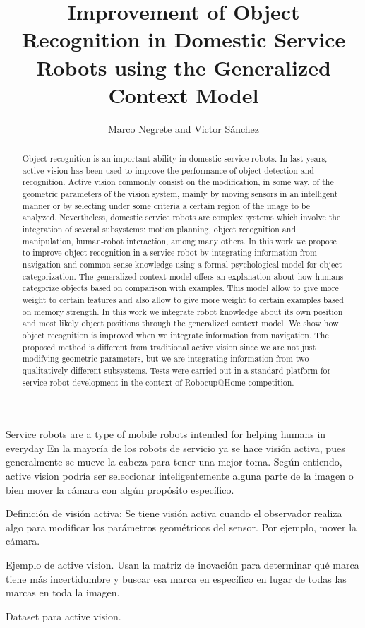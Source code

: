 \documentclass[a4paper, 10pt]{article}
\begin{document}
\title{Improvement of Object Recognition in Domestic Service Robots using the Generalized Context Model}
\author{Marco Negrete and Victor Sánchez}

\maketitle
\begin{abstract}
  Object recognition is an important ability in domestic service robots. In last years, active vision has been used to improve the performance of object detection and recognition. Active vision commonly consist on the modification, in some way, of the geometric parameters of the vision system, mainly by moving sensors in an intelligent manner or by selecting under some criteria a certain region of the image to be analyzed. Nevertheless, domestic service robots are complex systems which involve the integration of several subsystems: motion planning, object recognition and manipulation, human-robot interaction, among many others. In this work we propose to improve object recognition in a service robot by integrating information from navigation and common sense knowledge using a formal psychological model for object categorization. The generalized context model offers an explanation about how humans categorize objects based on comparison with examples. This model allow to give more weight to certain features and also allow to give more weight to certain examples based on memory strength. In this work we integrate robot knowledge about its own position and most likely object positions through the generalized context model. We show how object recognition is improved when we integrate information from navigation. The proposed method is different from traditional active vision since we are not just modifying geometric parameters, but we are integrating information from two qualitatively different subsystems. Tests were carried out in a standard platform for service robot development in the context of Robocup@Home competition. 
\end{abstract}

Service robots are a type of mobile robots intended for helping humans in everyday En la mayoría de los robots de servicio ya se hace visión activa, pues generalmente se mueve la cabeza para tener una mejor toma. Según entiendo, active vision podría ser seleccionar inteligentemente alguna parte de la imagen o bien mover la cámara con algún propósito específico. 

\cite{aloimonos1988active} Definición de visión activa: Se tiene visión activa cuando el observador realiza algo para modificar los parámetros geométricos del sensor. Por ejemplo, mover la cámara.

\cite{davison2002simultaneous} Ejemplo de active vision. Usan la matriz de inovación para determinar qué marca tiene más incertidumbre y buscar esa marca en específico en lugar de todas las marcas en toda la imagen.

\cite{ammirato2017dataset} Dataset para active vision. 




\end{document}
